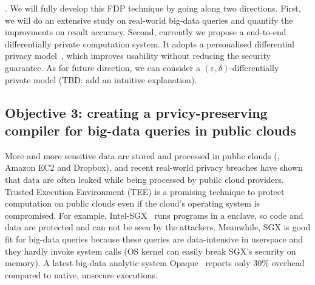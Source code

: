 . We will fully develop this FDP technique by going 
along two directions. First, we will do an extensive study on real-world 
big-data queries and quantify the improvments on result accuracy. Second, 
currently we propose a end-to-end differentially private computation
system. It adopts a personalised differential privacy model~\cite{pdp:icde15},
which improves usability without reducing the security guarantee. As for future 
direction, we can consider a 
$(\varepsilon, \delta)$-differentially~\cite{differntialprivacy:tcc06}
private model (TBD: add an intuitive explanation).


\vspace{-.15in}\subsection{Objective 3: creating a prvicy-preserving compiler 
for big-data queries in public clouds}\label{sec:obj3}\vspace{-.075in}


More and more sensitive data are stored and processed in public clouds (\eg, 
Amazon EC2 and Dropbox), and recent real-world privacy breaches have shown that 
data are often leaked while being processed by pubilc cloud providers. Trusted 
Execution Environment (TEE) is a promising technique to protect computation on 
public clouds even if the cloud's operating system is compromised. For example, 
Intel-SGX~\cite{intel-sgx} runs programs in a enclave, so code and data are 
protected and can not be seen by the attackers. Meanwhile, SGX is good fit for 
big-data queries because these queries are data-intensive in userspace and they 
hardly invoke system calls (OS kernel can easily break SGX's security on 
memory). A latest big-data analytic system Opaque~\cite{opaque:nsdi17} reports 
only 30\% overhead compared to native, unsecure executions.

\vspace{-.15in}

